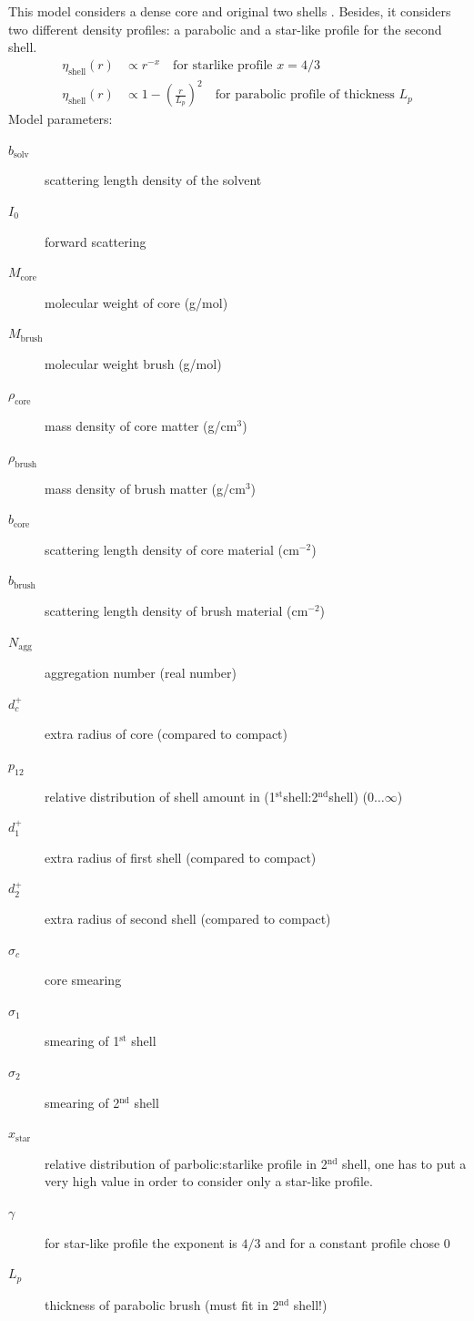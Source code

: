 This model considers a dense core and original two shells
\cite{Willner2000}. Besides, it considers two different density
profiles: a parabolic and a star-like profile for the second shell.
\begin{align}
\eta_\text{shell}(r) & \propto r^{-x} \quad \text{for starlike profile $x=4/3$}\\
\eta_\text{shell}(r) & \propto 1-\left(\frac{r}{L_p}\right)^{2}
\quad \text{for parabolic profile of thickness $L_p$}
\end{align}
Model parameters:
\begin{description}
\item[$b_\text{solv}$]  scattering length density of the solvent
\item[$I_0$] forward scattering
\item[$M_\text{core}$] molecular weight of core (g/mol)
\item[$M_\text{brush}$] molecular weight brush (g/mol)
\item[$\rho_\text{core}$] mass density of core matter (g/cm$^3$)
\item[$\rho_\text{brush}$] mass density of brush matter (g/cm$^3$)
\item[$b_\text{core}$] scattering length density of core material (cm$^{-2}$)
\item[$b_\text{brush}$] scattering length density of brush material (cm$^{-2}$)
\item[$N_\text{agg}$] aggregation number (real number)
\item[$d_c^+$] extra radius of core (compared to compact)
\item[$p_{12}$] relative distribution of shell amount in
(1$^\text{st}$shell:2$^\text{nd}$shell) ($0\ldots\infty$)
\item[$d_1^+$] extra radius of first shell (compared to compact)
\item[$d_2^+$] extra radius of second shell (compared to compact)
\item[$\sigma_c$] core smearing
\item[$\sigma_1$] smearing of 1$^\text{st}$ shell
\item[$\sigma_2$] smearing of 2$^\text{nd}$ shell
\item[$x_\text{star}$] relative distribution of
parbolic:starlike profile in 2$^\text{nd}$ shell, one has to put a
very high value in order to consider only a star-like profile.
\item[$\gamma$] for star-like profile the exponent is $4/3$ and for a constant profile chose 0
\item[$L_p$] thickness of parabolic brush (must fit in 2$^\text{nd}$ shell!)
\end{description}
